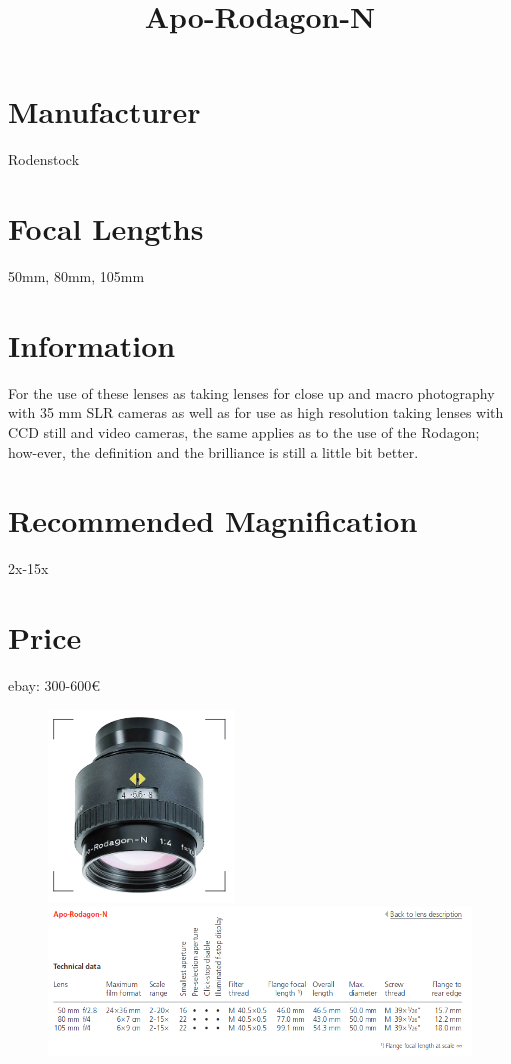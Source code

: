 \documentclass{article}
\begin{document}
\usepackage{titlesec}
\usepackage{graphicx}


\title{Apo-Rodagon-N}
\section{Manufacturer}
Rodenstock
\section{Focal Lengths}
50mm, 80mm, 105mm   
\section{Information}

For the use of these lenses as taking lenses for close up and macro photography with 35 mm SLR cameras as well as for use as high resolution taking lenses with CCD still and video cameras, the same applies as to the use of the Rodagon; how-ever, the definition and the brilliance is still a little bit better.

\section{Recommended Magnification}
2x-15x
\section{Price}

ebay: 300-600€

\begin{figure}
\centering
\includegraphics[width=\textwidth]{apo-rodagon-n-1.png}
\includegraphics[width=\textwidth]{apo-rodagon-n-2.png}
\end{figure}
\end{document}
